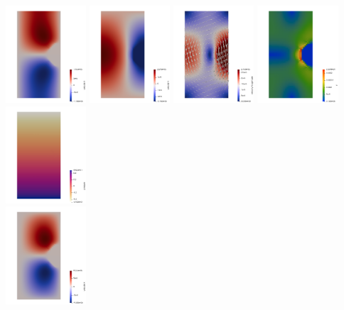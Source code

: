\begin{center}
\includegraphics[width=3cm]{python_codes/fieldstone_02/results/u0}
\includegraphics[width=3cm]{python_codes/fieldstone_02/results/v0}
\includegraphics[width=3cm]{python_codes/fieldstone_02/results/vel0}
\includegraphics[width=3cm]{python_codes/fieldstone_02/results/sr0}
\includegraphics[width=3cm]{python_codes/fieldstone_02/results/p0}\\
\includegraphics[width=3cm]{python_codes/fieldstone_02/results/u1}

\end{center}
